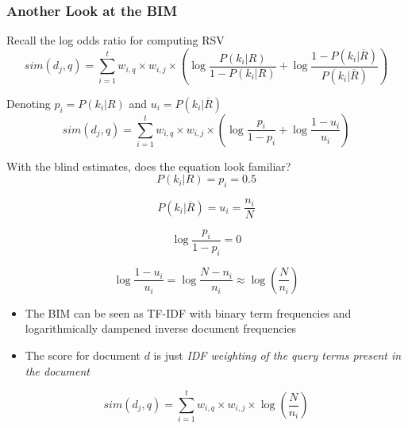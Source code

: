 \documentclass[svgnames]{beamer}
\begin{document}
\begin{frame}[allowframebreaks]
\frametitle{Another Look at the BIM}

  \begin{block}{Recall the log odds ratio for computing RSV}
    \small
    \begin{displaymath}      
      sim(d_j,q) = \sum_{i=1}^t w_{i,q} \times w_{i,j} \times
      \left(
        \log\frac{P(k_i|R)}{1-P(k_i|R)} + \log\frac{1-P(k_i|\overline{R})}{P(k_i|\overline{R})}
      \right)
    \end{displaymath}
  \end{block}
  
  \begin{block}{Denoting $p_i = P(k_i|R)$ and $u_i = P(k_i|\overline{R})$}
    \small
    \begin{displaymath}      
      sim(d_j,q) = \sum_{i=1}^t w_{i,q} \times w_{i,j} \times
      \left(
        \log\frac{p_i}{1 - p_i} + \log\frac{1 - u_i}{u_i}
      \right)
    \end{displaymath}
  \end{block}
		
  \begin{block}{With the blind estimates, does the equation look familiar?}
    \begin{displaymath}  
    P(k_i|R) = p_i = 0.5
    \end{displaymath}
    
    \begin{displaymath}  
    P(k_i|\overline{R}) = u_i = \frac{n_i}{N}
    \end{displaymath}
    
     \begin{displaymath}      
       \log\frac{p_i}{1 - p_i} = 0
    \end{displaymath}
    
    \begin{displaymath}      
       \log\frac{1 - u_i}{u_i} = \log\frac{N - n_i}{n_i} \approx \log \left( \frac{N}{n_i} \right)
    \end{displaymath}
  \end{block}
  
  \begin{block}{}
    \begin{itemize}
    \item The BIM can be seen as TF-IDF with binary term frequencies and logarithmically dampened inverse document frequencies
    \item The score for document $d$ is just \emph{IDF weighting of the query terms present in the document}
    \end{itemize}
	\begin{displaymath}  
	sim(d_j,q) = \sum_{i=1}^t w_{i,q} \times w_{i,j} \times \log \left( \frac{N}{n_i} \right)
	\end{displaymath}
  \end{block}
\end{frame}
\end{document}
